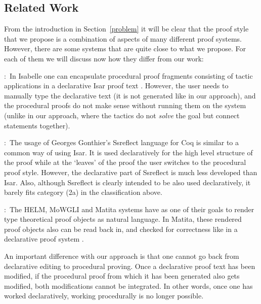 \documentclass{LMCS}
\begin{document}
\subsection{Related Work}\label{related}

\noindent
From the introduction in Section~\ref{problem} it will be clear
that the proof style that we propose is a combination of aspects of
many different proof systems.
However, there are some systems that are quite close
to what we propose.
For each of them we will discuss now how they differ from
our work:
\begin{desCription}
\item{}:\ In Isabelle one can
  encapsulate procedural proof fragments consisting of tactic
  applications in a declarative Isar proof text
  \cite{wen:02,wen:02:1}.  However, the user needs to manually type
  the declarative text (it is not generated like in our approach), and
  the procedural proofs do not make sense without running them on the
  system (unlike in our approach, where the tactics do not
  \emph{solve} the goal but connect statements together).
\medskip

\item{}:\ The usage of Georges
  Gonthier's Ssreflect language for Coq \cite{gon:mah:tas:08} is
  similar to a common way of using Isar.  It is used declaratively for
  the high level structure of the proof while at the `leaves' of the
  proof the user switches to the procedural proof style.  However, the
  declarative part of Ssreflect is much less developed than Isar.
  Also, although Ssreflect is clearly intended to be also used
  declaratively, it barely fits category (2a) in the classification
  above.
\medskip

\item{}:\ The HELM, MoWGLI
  and Matita systems \cite{asp:coe:tas:zac:07,asp:03,asp:weg:02} have
  as one of their goals to render type theoretical proof objects as
  natural language.  In Matita, these rendered proof objects also can
  be read back in, and checked for correctness like in a declarative
  proof system \cite{coe:10}.

An important difference with our approach is that one cannot go
back from declarative editing to procedural proving.
Once a declarative proof text has been modified, if the
procedural proof from which it has been generated also gets modified,
both modifications cannot be integrated.
In other words, once one has worked declaratively, working procedurally
is no longer possible.


\end{desCription}
\end{document}

